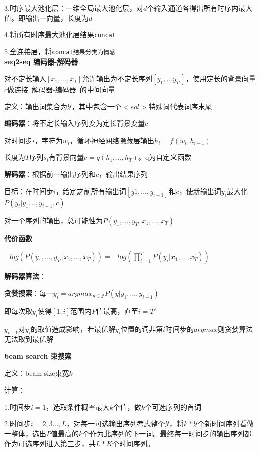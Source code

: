 \documentclass[UTF8]{ctexart}
\begin{document}
  \quad 3.时序最大池化层：一维全局最大池化层，对$d$个输入通道各得出所有时序内最大值。即输出一向量，长度为$d$
  
  \quad 4.将所有时序最大池化层结果\texttt{concat}

  \quad 5.全连接层，将\texttt{concat结果分类为情感}\\
\textbf{seq2seq 编码器-解码器}

  对不定长输入$[x_1, ..., x_T]$允许输出为不定长序列$[y_1,...y_{T'}]$，使用定长的背景向量$c$做连接\ 解码器-编码器\ 的中间向量

  定义：输出词集合为$\mathcal{Y} $，其中包含一个$<eol>$特殊词代表词序末尾


  \textbf{编码器}：将不定长输入序列变为定长背景变量$c$

  \quad 对时间步$i$，字符为$w_i$，循环神经网络隐藏层输出$h_i = f(w_i, h_{i-1})$

  \quad 长度为$T$序列$s_i$有背景向量$c = q(h_1, ..., h_T)$。q为自定义函数

  \textbf{解码器}：根据前一输出序列和$c$，输出结果序列

  \quad 目标：在时间步$i$，给定之前所有输出词$[y1, ..., y_{i-1}]$和$c$，使新输出词$y_i$最大化$P(y_i | y_{1}, .., y_{i-1}, c)$

  \quad 对一个序列的输出，总可能性为$ P(y_1,...,y_{T'} | x_1, ..., x_T)$

  \textbf{代价函数}

  \quad $-log(P(y_1,...,y_{T'} | x_1, ..., x_T)) = -log(\prod_{i=1}^{T'} P(y_i | x_1, ..., x_T))$
  
  \textbf{解码器算法}：

  \quad \textbf{贪婪搜索}：每一$y_i = argmax_{y\in \mathcal{Y} }P(y|y_1, ..., y_{i-1})$

  \quad \quad 即每次取$y_i$使得$[1, i]$范围内$P$值最高，直至$i = T'$

  \quad \quad $y_{i-1}$对$y_i$的取值造成影响，若最优解$y_i$位置的词非第$i$时间步的$argmax$则贪婪算法无法取到最优解

  \textbf{beam search 束搜索}
  
  \quad 定义：beam size束宽$k$

  \quad 计算：
  
  \quad \quad 1.时间步$i = 1$，选取条件概率最大$k$个值，做$k$个可选序列的首词
  
  \quad \quad 2.时间步$i = 2,3...,L$，对每一可选输出序列考虑整个$\mathcal{Y} $，将$k*\mathcal{Y} $个新时间序列看做一整体，选出$P$值最高的$k$个作为此序列的下一词。最终每一时间步的输出序列都作为可选序列进入第三步，共$L*K$个时间序列。
  
\end{document}
